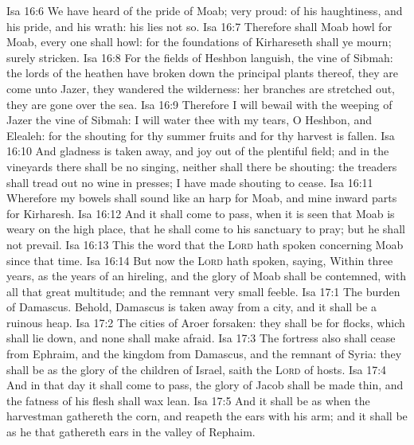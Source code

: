 \vs Isa 16:6 We have heard of the pride of Moab;  very proud:  of his haughtiness, and his pride, and his wrath:  his lies  not  so.
\vs Isa 16:7 Therefore shall Moab howl for Moab, every one shall howl: for the foundations of Kirhareseth shall ye mourn; surely  stricken.
\vs Isa 16:8 For the fields of Heshbon languish,  the vine of Sibmah: the lords of the heathen have broken down the principal plants thereof, they are come  unto Jazer, they wandered  the wilderness: her branches are stretched out, they are gone over the sea.
\vs Isa 16:9 Therefore I will bewail with the weeping of Jazer the vine of Sibmah: I will water thee with my tears, O Heshbon, and Elealeh: for the shouting for thy summer fruits and for thy harvest is fallen.
\vs Isa 16:10 And gladness is taken away, and joy out of the plentiful field; and in the vineyards there shall be no singing, neither shall there be shouting: the treaders shall tread out no wine in  presses; I have made  shouting to cease.
\vs Isa 16:11 Wherefore my bowels shall sound like an harp for Moab, and mine inward parts for Kirharesh.
\vs Isa 16:12 And it shall come to pass, when it is seen that Moab is weary on the high place, that he shall come to his sanctuary to pray; but he shall not prevail.
\vs Isa 16:13 This  the word that the \textsc{Lord} hath spoken concerning Moab since that time.
\vs Isa 16:14 But now the \textsc{Lord} hath spoken, saying, Within three years, as the years of an hireling, and the glory of Moab shall be contemned, with all that great multitude; and the remnant  very small  feeble.
\vs Isa 17:1 The burden of Damascus. Behold, Damascus is taken away from  a city, and it shall be a ruinous heap.
\vs Isa 17:2 The cities of Aroer  forsaken: they shall be for flocks, which shall lie down, and none shall make  afraid.
\vs Isa 17:3 The fortress also shall cease from Ephraim, and the kingdom from Damascus, and the remnant of Syria: they shall be as the glory of the children of Israel, saith the \textsc{Lord} of hosts.
\vs Isa 17:4 And in that day it shall come to pass,  the glory of Jacob shall be made thin, and the fatness of his flesh shall wax lean.
\vs Isa 17:5 And it shall be as when the harvestman gathereth the corn, and reapeth the ears with his arm; and it shall be as he that gathereth ears in the valley of Rephaim.
